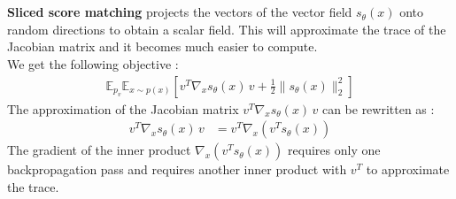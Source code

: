 \documentclass[twoside]{article}
\numberwithin{equation}{section}
\numberwithin{figure}{section}
\begin{document}
\\\\
\textbf{Sliced score matching} \cite{song2019sliced} projects the vectors of the vector field $s_\theta (x)$ onto random directions to obtain a scalar field. This will approximate the trace of the Jacobian matrix and it becomes much easier to compute. \cite{song2020generative} \\
We get the following objective \cite{song2019sliced}:
\begin{align}
  \mathbb{E}_{p_v} \mathbb{E}_{x \sim p(x)} \left[ v^T \nabla_x s_\theta (x) \, v + \frac{1}{2} \| s_\theta (x) \|_2^2 \right]
\end{align}
The approximation of the Jacobian matrix $v^T \nabla_x s_\theta (x) \, v$ can be rewritten as \cite{song2019sliced}:
\begin{align}
  v^T \nabla_x s_\theta (x) \, v &= v^T \nabla_x (v^T s_\theta (x))
\end{align}
The gradient of the inner product $\nabla_x (v^T s_\theta (x))$ requires only one backpropagation pass and requires another inner product with $v^T$ to approximate the trace. \cite{song2019sliced} 
\end{document}
